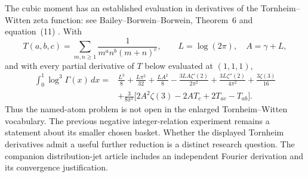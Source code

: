 \begin{result}
\label{integral:neg:cubic}
The cubic moment has an established evaluation in derivatives of the
Tornheim--Witten zeta function: see Bailey--Borwein--Borwein,
Theorem~6 and equation~(11) \cite{distjets:BBB2015}.
With
\[
 T(a,b,c)=\sum_{m,n\ge1}\frac1{m^a n^b(m+n)^c},\qquad
 L=\log(2\pi),\quad A=\gamma+L,
\]
and with every partial derivative of $T$ below evaluated at $(1,1,1)$,
\begin{align*}
\int_0^1\log^3\Gamma(x)\,dx
={}&\frac{L^3}{8}+\frac{L\pi^2}{32}+\frac{LA^2}{8}
-\frac{3LA\zeta'(2)}{2\pi^2}+\frac{3L\zeta''(2)}{4\pi^2}
+\frac{3\zeta(3)}{16}\\
&+\frac3{8\pi^2}
\bigl[2A^2\zeta(3)-2A T_c+2T_{ac}-T_{ab}\bigr].
\end{align*}
Thus the named-atom problem is not open in the enlarged Tornheim--Witten
vocabulary. The previous negative integer-relation experiment remains a
statement about its smaller chosen basket. Whether the displayed
Tornheim derivatives admit a useful further reduction is a distinct
research question. The companion distribution-jet article includes an
independent Fourier derivation and its convergence justification.
\end{result}
